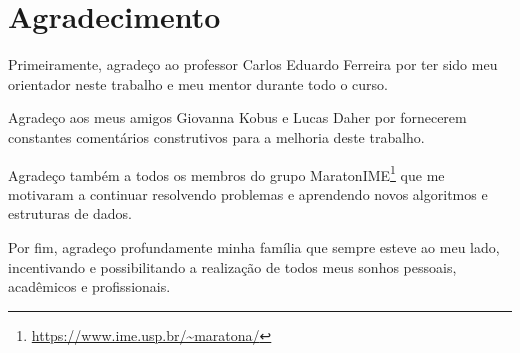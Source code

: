 \chapter*{Agradecimento}
\label{agradecimento}

Primeiramente, agradeço ao professor Carlos Eduardo Ferreira por ter sido meu orientador neste trabalho e meu mentor durante todo o curso. 

Agradeço aos meus amigos Giovanna Kobus e Lucas Daher por fornecerem constantes comentários construtivos para a melhoria deste trabalho.

Agradeço também a todos os membros do grupo MaratonIME\footnote{\url{https://www.ime.usp.br/~maratona/}} que me motivaram a continuar resolvendo problemas e aprendendo novos algoritmos e estruturas de dados.

Por fim, agradeço profundamente minha família que sempre esteve ao meu lado, incentivando e possibilitando a realização de todos meus sonhos pessoais, acadêmicos e profissionais.